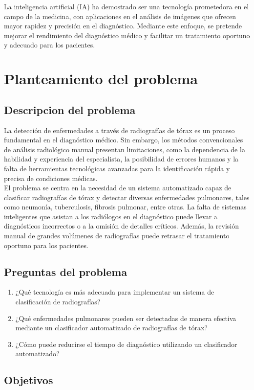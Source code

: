 \documentclass[conference]{IEEEtran}
\begin{document}
La inteligencia artificial (IA) ha demostrado ser una tecnología prometedora en el campo de la medicina, con aplicaciones en el análisis de imágenes que ofrecen mayor rapidez y precisión en el diagnóstico. Mediante este enfoque, se pretende mejorar el rendimiento del diagnóstico médico y facilitar un tratamiento oportuno y adecuado para los pacientes.
\section{Planteamiento del problema}
\subsection{Descripcion del problema}
La detección de enfermedades a través de radiografías de tórax es un proceso fundamental en el diagnóstico médico. Sin embargo, los métodos convencionales de análisis radiológico manual presentan limitaciones, como la dependencia de la habilidad y experiencia del especialista, la posibilidad de errores humanos y la falta de herramientas tecnológicas avanzadas para la identificación rápida y precisa de condiciones médicas.\\

El problema se centra en la necesidad de un sistema automatizado capaz de clasificar radiografías de tórax y detectar diversas enfermedades pulmonares, tales como neumonía, tuberculosis, fibrosis pulmonar, entre otras. La falta de sistemas inteligentes que asistan a los radiólogos en el diagnóstico puede llevar a diagnósticos incorrectos o a la omisión de detalles críticos. Además, la revisión manual de grandes volúmenes de radiografías puede retrasar el tratamiento oportuno para los pacientes.
\subsection{Preguntas del problema}
\begin{enumerate}
    \item ¿Qué tecnología es más adecuada para implementar un sistema de clasificación de radiografías?
    \item ¿Qué enfermedades pulmonares pueden ser detectadas de manera efectiva mediante un clasificador automatizado de radiografías de tórax?
    \item ¿Cómo puede reducirse el tiempo de diagnóstico utilizando un clasificador automatizado?
\end{enumerate}
\subsection{Objetivos}
\end{document}
